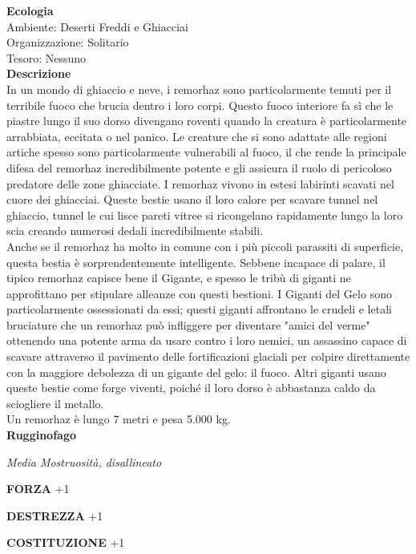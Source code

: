 \begin{multicols}{2}
\textbf{Ecologia}\\
Ambiente: Deserti Freddi e Ghiacciai\\
Organizzazione: Solitario\\
Tesoro: Nessuno\\
\textbf{Descrizione}\\
In un mondo di ghiaccio e neve, i remorhaz sono particolarmente temuti per il terribile fuoco che brucia dentro i loro corpi. Questo fuoco interiore fa sì che le piastre lungo il suo dorso divengano roventi quando la creatura è particolarmente arrabbiata, eccitata o nel panico. Le creature che si sono adattate alle regioni artiche spesso sono particolarmente vulnerabili al fuoco, il che rende la principale difesa del remorhaz incredibilmente potente e gli assicura il ruolo di pericoloso predatore delle zone ghiacciate. I remorhaz vivono in estesi labirinti scavati nel cuore dei ghiacciai. Queste bestie usano il loro calore per scavare tunnel nel ghiaccio, tunnel le cui lisce pareti vitree si ricongelano rapidamente lungo la loro scia creando numerosi dedali incredibilmente stabili.\\

Anche se il remorhaz ha molto in comune con i più piccoli parassiti di superficie, questa bestia è sorprendentemente intelligente. Sebbene incapace di palare, il tipico remorhaz capisce bene il Gigante, e spesso le tribù di giganti ne approfittano per stipulare alleanze con questi bestioni. I Giganti del Gelo sono particolarmente ossessionati da essi; questi giganti affrontano le crudeli e letali bruciature che un remorhaz può infliggere per diventare "amici del verme" ottenendo una potente arma da usare contro i loro nemici, un assassino capace di scavare attraverso il pavimento delle fortificazioni glaciali per colpire direttamente con la maggiore debolezza di un gigante del gelo: il fuoco. Altri giganti usano queste bestie come forge viventi, poiché il loro dorso è abbastanza caldo da sciogliere il metallo.\\
Un remorhaz è lungo 7 metri e pesa 5.000 kg.\\



\medskip{}\textbf{Rugginofago}

\emph{Media Mostruosità, disallineato}

\textbf{FORZA} +1

\textbf{DESTREZZA} +1

\textbf{COSTITUZIONE} +1


\end{multicols}
